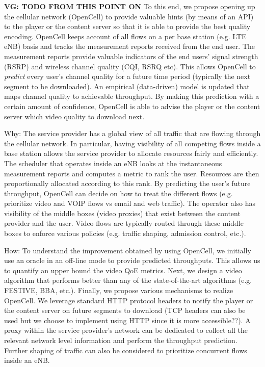 \textbf{VG: TODO FROM THIS POINT ON}
To this end, we propose opening up
the cellular network (OpenCell) to provide valuable hints (by means of
an API) to the player or the content server so that it is able to
provide the best quality encoding. OpenCell keeps account of all flows
on a per base station (e.g. LTE eNB) basis and tracks the measurement
reports received from the end user. The measurement reports provide
valuable indicators of the end users' signal strength (RSRP) and
wireless channel quality (CQI, RSRQ etc). This allows OpenCell to {\em
  predict} every user's channel quality for a future time period
(typically the next segment to be downloaded). An empirical
(data-driven) model is updated that maps channel quality to achievable
throughput. By making this prediction with a certain amount of
confidence, OpenCell is able to advise the player or the content
server which video quality to download next.

Why: The service provider has a global view of all traffic that are
flowing through the cellular network. In particular, having visibility
of all competing flows inside a base station allows the service
provider to allocate resources fairly and efficiently. The scheduler
that operates inside an eNB looks at the instantaneous measurement
reports and computes a metric to rank the user. Resources are then
proportionally allocated according to this rank. By predicting the
user's future throughput, OpenCell can decide on how to treat the
different flows (e.g. prioritize video and VOIP flows vs email and web
traffic). The operator also has visibility of the middle boxes (video
proxies) that exist between the content provider and the user. Video
flows are typically routed through these middle boxes to enforce
various policies (e.g. traffic shaping, admission control, etc.).

How: To understand the improvement obtained by using OpenCell, we
initially use an oracle in an off-line mode to provide predicted
throughputs. This allows us to quantify an upper bound the video QoE
metrics. Next, we design a video algorithm that performs better than
any of the state-of-the-art algorithms (e.g. FESTIVE, BBA,
etc.). Finally, we propose various mechanisms to realize OpenCell. We
leverage standard HTTP protocol headers to notify the player or the
content server on future segments to download (TCP headers can also be
used but we choose to implement using HTTP since it is more
accessible??). A proxy within the service provider's network can be
dedicated to collect all the relevant network level information and
perform the throughput prediction. Further shaping of traffic can also
be considered to prioritize concurrent flows inside an eNB.

